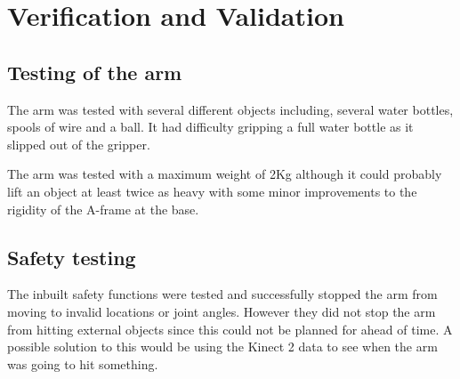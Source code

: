 \section{Verification and Validation}
\subsection{Testing of the arm}
The arm was tested with several different objects including, several water bottles, spools of wire and a ball. It had difficulty gripping a full water bottle as it slipped out of the gripper.

The arm was tested with a maximum weight of 2Kg although it could probably lift an object at least twice as heavy with some minor improvements to the rigidity of the A-frame at the base.
\subsection{Safety testing}
The inbuilt safety functions were tested and successfully stopped the arm from moving to invalid locations or joint angles. However they did not stop the arm from hitting external objects since this could not be planned for ahead of time. A possible solution to this would be using the Kinect 2 data to see when the arm was going to hit something.




